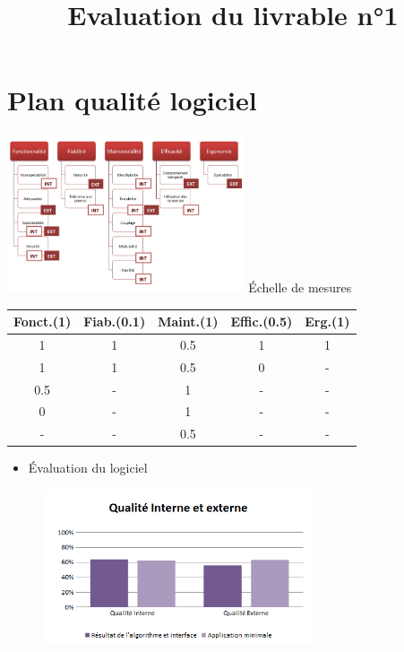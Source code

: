\documentclass{beamer}
\begin{document}
\section{Plan qualit\'e logiciel}
	\begin{frame} {\secname}
		\title{Evaluation du livrable n°1}
\begin{center}	
		\includegraphics[width=7cm]{iso9126}
		Échelle de mesures
		
		\begin{tabular}{|c|c|c|c|c|}
		
			\hline
			Fonct.(1) & Fiab.(0.1) & Maint.(1) & Effic.(0.5) & Erg.(1)\\
			\hline
			1 & 1 & 0.5 & 1 & 1\\
			\hline
			1 & 1 & 0.5 & 0 & - \\
			\hline
			0.5 & - & 1 & - & -\\
			\hline
			0 & - & 1 & - & - \\
			\hline
			- & - & 0.5 & - & - \\
			\hline
		\end{tabular}	
		
		
\end{center}

	\end{frame}

	\begin{frame}{\secname}
		\begin{itemize}
			\item \'Evaluation du logiciel 
		\end{itemize}
		\begin{figure}
			\includegraphics[width=8cm]{Images/QualiteInterneExterne.png}
		\end{figure}
	\end{frame}
\end{document}
